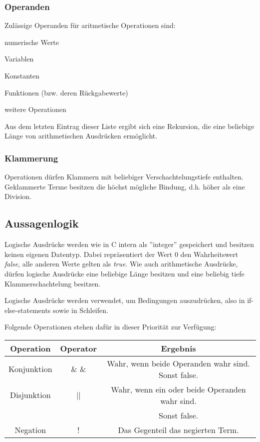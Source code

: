 \subsubsection{Operanden}
Zulässige Operanden für aritmetische Operationen sind:

\begin{list}{•}
\item numerische Werte \item
\item Variablen
\item Konstanten
\item Funktionen (bzw. deren Rückgabewerte)
\item weitere Operationen
\end{list}

Aus dem letzten Eintrag dieser Liste ergibt sich eine Rekursion, die eine beliebige Länge von arithmetischen Ausdrücken ermöglicht.

\subsubsection{Klammerung}
Operationen dürfen Klammern mit beliebiger Verschachtelungstiefe enthalten.
Geklammerte Terme besitzen die höchst mögliche Bindung, d.h. höher als eine Division.

\subsection{Aussagenlogik}
Logische Ausdrücke werden wie in C intern als ''integer'' gespeichert und besitzen keinen eigenen Datentyp. Dabei repräsentiert der Wert 0 den Wahrheitswert \textit{false}, alle anderen Werte gelten als \textit{true}. Wie auch arithmetische Ausdrücke, dürfen logische Ausdrücke eine beliebige Länge besitzen und eine beliebig tiefe Klammerschachtelung besitzen.

Logische Ausdrücke werden verwendet, um Bedingungen auszudrücken, also in if-else-statements sowie in Schleifen.

Folgende Operationen stehen dafür in dieser Priorität zur Verfügung:
\begin{center}
  \begin{tabular}{ | c | c | c | }
    \hline
    Operation & Operator & Ergebnis\\ \hline \hline
    Konjunktion & \& \& & Wahr, wenn beide Operanden wahr sind. Sonst false.\\ \hline
    Disjunktion & || & Wahr, wenn ein oder beide Operanden wahr sind. \\ 
	& & Sonst false.\\ \hline
    Negation & ! & Das Gegenteil das negierten Term.\\ \hline   
  \end{tabular}
\end{center}

